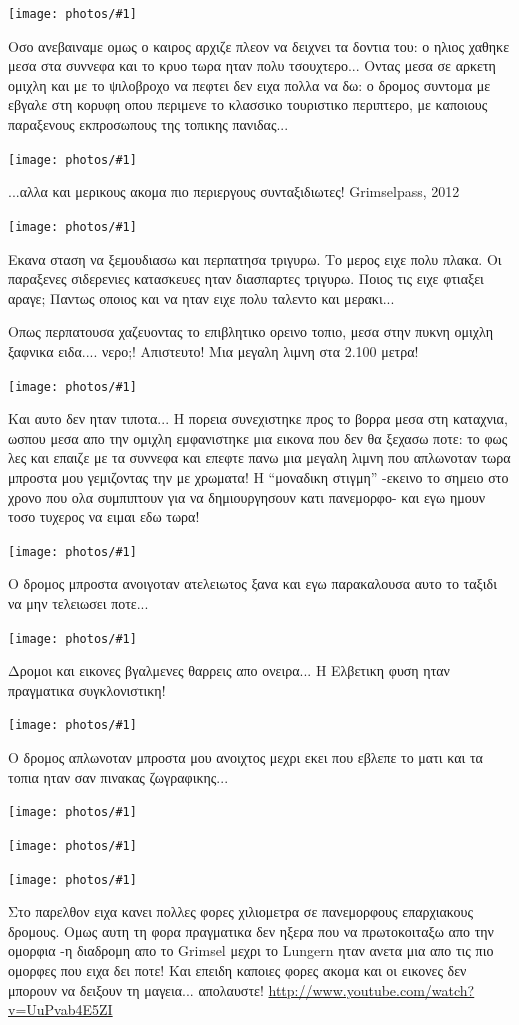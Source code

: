 \documentclass[11pt, letterpaper]{book}
\newcommand\photo[1]{\begin{center}\noindent\texttt{[image: photos/\#1]}\end{center}}
\begin{document}
\photo{63.jpg}

Οσο ανεβαιναμε ομως ο καιρος αρχιζε πλεον να δειχνει τα δοντια του: ο ηλιος χαθηκε μεσα στα συννεφα και το κρυο τωρα ηταν πολυ τσουχτερο... 
Οντας μεσα σε αρκετη ομιχλη και με το ψιλοβροχο να πεφτει δεν ειχα πολλα να δω: ο δρομος συντομα με εβγαλε στη κορυφη οπου περιμενε το κλασσικο τουριστικο περιπτερο, με καποιους παραξενους εκπροσωπους της τοπικης πανιδας...

\photo{64.jpg}

...αλλα και μερικους ακομα πιο περιεργους συνταξιδιωτες!
Grimselpass, 2012

\photo{65.jpg}

Εκανα σταση να ξεμουδιασω και περπατησα τριγυρω. Το μερος ειχε πολυ πλακα. Οι παραξενες σιδερενιες κατασκευες ηταν διασπαρτες τριγυρω. Ποιος τις ειχε φτιαξει αραγε; Παντως οποιος και να ηταν ειχε πολυ ταλεντο και μερακι...

Οπως περπατουσα χαζευοντας το επιβλητικο ορεινο τοπιο, μεσα στην πυκνη ομιχλη ξαφνικα ειδα.... νερο;! Απιστευτο! Μια μεγαλη λιμνη στα 2.100 μετρα! 

\photo{66.jpg}

Και αυτο δεν ηταν τιποτα...
Η πορεια συνεχιστηκε προς το βορρα μεσα στη καταχνια, ωσπου μεσα απο την ομιχλη εμφανιστηκε μια εικονα που δεν θα ξεχασω ποτε: το φως λες και επαιζε με τα συννεφα και επεφτε πανω μια μεγαλη λιμνη που απλωνοταν τωρα μπροστα μου γεμιζοντας την με χρωματα! 
Η ``μοναδικη στιγμη'' -εκεινο το σημειο στο χρονο που ολα συμπιπτουν για να δημιουργησουν κατι πανεμορφο- και εγω ημουν τοσο τυχερος να ειμαι εδω τωρα!

\photo{67.jpg}

Ο δρομος μπροστα ανοιγοταν ατελειωτος ξανα και εγω παρακαλουσα αυτο το ταξιδι να μην τελειωσει ποτε...

\photo{68.jpg}

Δρομοι και εικονες βγαλμενες θαρρεις απο ονειρα... Η Ελβετικη φυση ηταν πραγματικα συγκλονιστικη!

\photo{69.jpg}

Ο δρομος απλωνοταν μπροστα μου ανοιχτος μεχρι εκει που εβλεπε το ματι και τα τοπια ηταν σαν πινακας ζωγραφικης...

\photo{70.jpg}
\photo{71.jpg}
\photo{72.jpg}

Στο παρελθον ειχα κανει πολλες φορες χιλιομετρα σε πανεμορφους επαρχιακους δρομους. Ομως αυτη τη φορα πραγματικα δεν ηξερα που να πρωτοκοιταξω απο την ομορφια -η διαδρομη απο το Grimsel μεχρι το Lungern ηταν ανετα μια απο τις πιο ομορφες που ειχα δει ποτε! Και επειδη καποιες φορες ακομα και οι εικονες δεν μπορουν να δειξουν τη μαγεια... απολαυστε! \url{http://www.youtube.com/watch?v=UuPvab4E5ZI}
\end{document}
